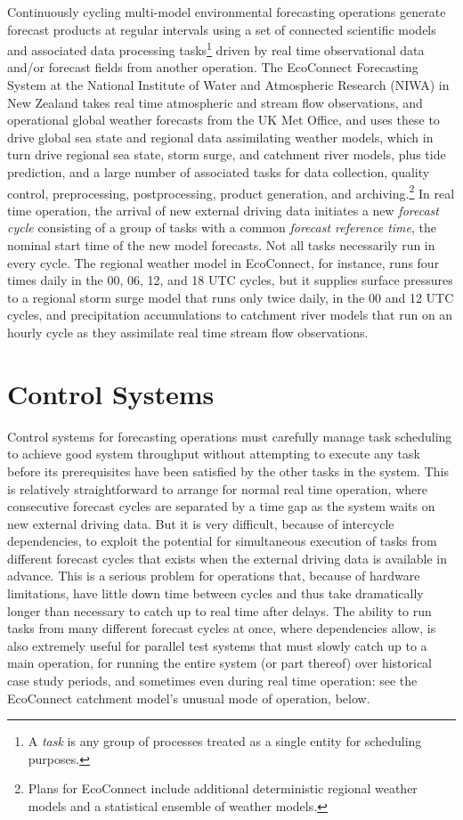 \documentclass[11pt,a4paper]{article}
\begin{document}
Continuously cycling multi-model environmental forecasting operations
generate forecast products at regular intervals using a set of connected
scientific models and associated data processing tasks\footnote{A {\em
task} is any group of processes treated as a single entity for
scheduling purposes.} driven by real time observational data and/or forecast
fields from another operation.  The EcoConnect Forecasting System at the
National Institute of Water and Atmospheric Research (NIWA) in New
Zealand takes real time atmospheric and stream flow observations, and
operational global weather forecasts from the UK Met Office, and uses
these to drive global sea state and regional data assimilating weather
models, which in turn drive regional sea state, storm surge, and
catchment river models, plus tide prediction, and a large number of
associated tasks for data collection, quality control, preprocessing,
postprocessing, product generation, and archiving.\footnote{Plans for
EcoConnect include additional deterministic regional weather models and
a statistical ensemble of weather models.}  In real time operation, the
arrival of new external driving data initiates a new {\em forecast
cycle} consisting of a group of tasks with a common {\em forecast
reference time}, the nominal start time of the new model forecasts. Not
all tasks necessarily run in every cycle. The regional weather model in
EcoConnect, for instance, runs four times daily in the 00, 06, 12, and
18 UTC cycles, but it supplies surface pressures to a regional storm
surge model that runs only twice daily, in the 00 and 12 UTC cycles, and
precipitation accumulations to catchment river models that run on an
hourly cycle as they assimilate real time stream flow observations. 

\section{Control Systems}

Control systems for forecasting operations must carefully manage task
scheduling to achieve good system throughput without attempting to
execute any task before its prerequisites have been satisfied by the
other tasks in the system. This is relatively straightforward to arrange
for normal real time operation, where consecutive forecast cycles are
separated by a time gap as the system waits on new external driving
data. But it is very difficult, because of intercycle dependencies, to
exploit the potential for simultaneous execution of tasks from different
forecast cycles that exists when the external driving data is available
in advance. This is a serious problem for operations that, because of
hardware limitations, have little down time between cycles and thus take
dramatically longer than necessary to catch up to real time after
delays. The ability to run tasks from many different forecast cycles at
once, where dependencies allow, is also extremely useful for parallel
test systems that must slowly catch up to a main operation, for running
the entire system (or part thereof) over historical case study periods,
and sometimes even during real time operation: see the EcoConnect
catchment model's unusual mode of operation, below.
\end{document}
